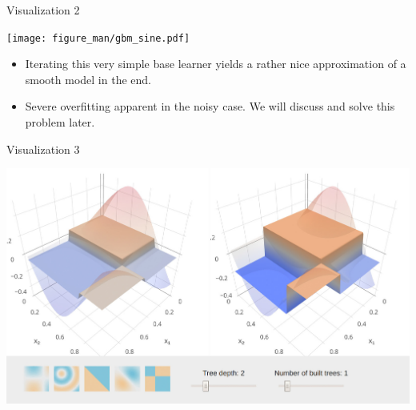 \begin{vbframe}{Visualization 2}

\vspace{-0.6cm}
\begin{center}
\texttt{[image: figure\_man/gbm\_sine.pdf]}
\end{center}

\vspace{-0.8cm}
\footnotesize
\begin{itemize}

  \item
    Iterating this very simple base learner yields a rather nice approximation of a smooth model in the end.

  \item
    Severe overfitting apparent in the noisy case. We will discuss and solve this problem later.

\end{itemize}

\end{vbframe}

\begin{vbframe}{Visualization 3}
\begin{center}
\includegraphics[width=\textwidth]{figure_man/gbm_anim/gbm1.jpg}
\href{http://arogozhnikov.github.io/2016/06/24/gradient_boosting_explained.html}{}
\end{center}
\end{vbframe}


